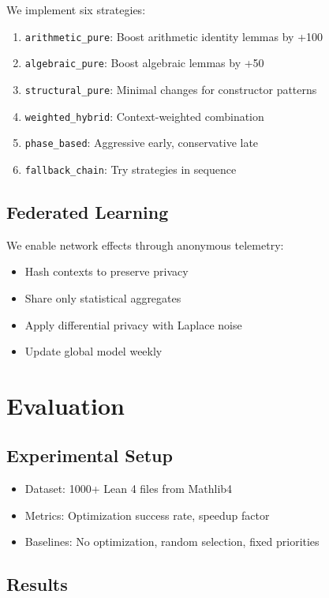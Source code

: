 \documentclass{article}
\theoremstyle{plain}
\theoremstyle{definition}
\begin{document}
We implement six strategies:
\begin{enumerate}
\item \texttt{arithmetic\_pure}: Boost arithmetic identity lemmas by +100
\item \texttt{algebraic\_pure}: Boost algebraic lemmas by +50
\item \texttt{structural\_pure}: Minimal changes for constructor patterns
\item \texttt{weighted\_hybrid}: Context-weighted combination
\item \texttt{phase\_based}: Aggressive early, conservative late
\item \texttt{fallback\_chain}: Try strategies in sequence
\end{enumerate}

\subsection{Federated Learning}

We enable network effects through anonymous telemetry:
\begin{itemize}
\item Hash contexts to preserve privacy
\item Share only statistical aggregates
\item Apply differential privacy with Laplace noise
\item Update global model weekly
\end{itemize}

\section{Evaluation}

\subsection{Experimental Setup}

\begin{itemize}
\item Dataset: 1000+ Lean 4 files from Mathlib4
\item Metrics: Optimization success rate, speedup factor
\item Baselines: No optimization, random selection, fixed priorities
\end{itemize}

\subsection{Results}
\end{document}
